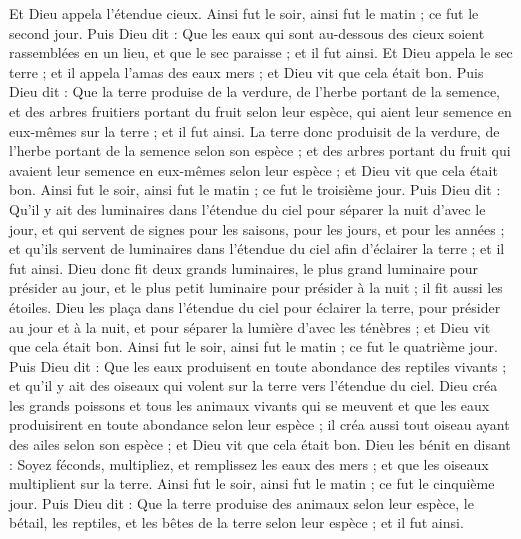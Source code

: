 \begin{multicols}{2}
Et Dieu appela l'étendue cieux. Ainsi fut le soir, ainsi fut le matin ; ce fut le second jour.
Puis Dieu dit : Que les eaux qui sont au-dessous des cieux soient rassemblées en un lieu, et que le sec paraisse ; et il fut ainsi.
Et Dieu appela le sec terre ; et il appela l'amas des eaux mers ; et Dieu vit que cela était bon.
Puis Dieu dit : Que la terre produise de la verdure, de l'herbe portant de la semence, et des arbres fruitiers portant du fruit selon leur espèce, qui aient leur semence en eux-mêmes sur la terre ; et il fut ainsi.
La terre donc produisit de la verdure, de l'herbe portant de la semence selon son espèce ; et des arbres portant du fruit qui avaient leur semence en eux-mêmes selon leur espèce ; et Dieu vit que cela était bon.
Ainsi fut le soir, ainsi fut le matin ; ce fut le troisième jour.
Puis Dieu dit : Qu'il y ait des luminaires dans l'étendue du ciel pour séparer la nuit d'avec le jour, et qui servent de signes pour les saisons, pour les jours, et pour les années ;
et qu’ils servent de luminaires dans l'étendue du ciel afin d'éclairer la terre ; et il fut ainsi.
Dieu donc fit deux grands luminaires, le plus grand luminaire pour présider au jour, et le plus petit luminaire pour présider à la nuit ; il fit aussi les étoiles.
Dieu les plaça dans l'étendue du ciel pour éclairer la terre,
pour présider au jour et à la nuit, et pour séparer la lumière d’avec les ténèbres ; et Dieu vit que cela était bon.
Ainsi fut le soir, ainsi fut le matin ; ce fut le quatrième jour.
Puis Dieu dit : Que les eaux produisent en toute abondance des reptiles vivants ; et qu'il y ait des oiseaux qui volent sur la terre vers l'étendue du ciel.
Dieu créa les grands poissons et tous les animaux vivants qui se meuvent et que les eaux produisirent en toute abondance selon leur espèce ; il créa aussi tout oiseau ayant des ailes selon son espèce ; et Dieu vit que cela était bon.
Dieu les bénit en disant : Soyez féconds, multipliez, et remplissez les eaux des mers ; et que les oiseaux multiplient sur la terre.
Ainsi fut le soir, ainsi fut le matin ; ce fut le cinquième jour.
Puis Dieu dit : Que la terre produise des animaux selon leur espèce, le bétail, les reptiles, et les bêtes de la terre selon leur espèce ; et il fut ainsi.

\end{multicols}

